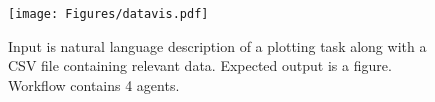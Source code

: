 {
\begin{figure}[h]
\begin{center}
\centerline{\texttt{[image: Figures/datavis.pdf]}}
{
Input is natural language description of a plotting task along with a CSV file containing relevant data. Expected output is a figure. Workflow contains 4 agents.
}
\end{center}
\label{fig-datavis-workflow}
\end{figure}
}